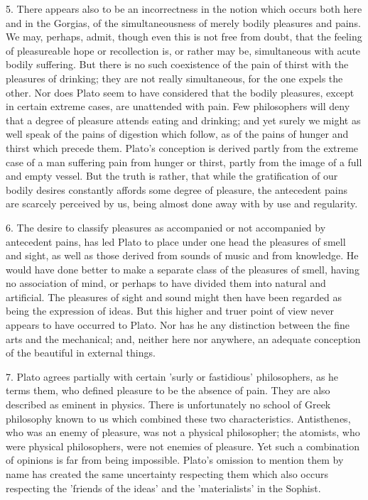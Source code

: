 \documentclass[11pt,letter]{article}
\begin{document}
\par  5. There appears also to be an incorrectness in the notion which occurs both here and in the Gorgias, of the simultaneousness of merely bodily pleasures and pains. We may, perhaps, admit, though even this is not free from doubt, that the feeling of pleasureable hope or recollection is, or rather may be, simultaneous with acute bodily suffering. But there is no such coexistence of the pain of thirst with the pleasures of drinking; they are not really simultaneous, for the one expels the other. Nor does Plato seem to have considered that the bodily pleasures, except in certain extreme cases, are unattended with pain. Few philosophers will deny that a degree of pleasure attends eating and drinking; and yet surely we might as well speak of the pains of digestion which follow, as of the pains of hunger and thirst which precede them. Plato's conception is derived partly from the extreme case of a man suffering pain from hunger or thirst, partly from the image of a full and empty vessel. But the truth is rather, that while the gratification of our bodily desires constantly affords some degree of pleasure, the antecedent pains are scarcely perceived by us, being almost done away with by use and regularity.

\par  6. The desire to classify pleasures as accompanied or not accompanied by antecedent pains, has led Plato to place under one head the pleasures of smell and sight, as well as those derived from sounds of music and from knowledge. He would have done better to make a separate class of the pleasures of smell, having no association of mind, or perhaps to have divided them into natural and artificial. The pleasures of sight and sound might then have been regarded as being the expression of ideas. But this higher and truer point of view never appears to have occurred to Plato. Nor has he any distinction between the fine arts and the mechanical; and, neither here nor anywhere, an adequate conception of the beautiful in external things.

\par  7. Plato agrees partially with certain 'surly or fastidious' philosophers, as he terms them, who defined pleasure to be the absence of pain. They are also described as eminent in physics. There is unfortunately no school of Greek philosophy known to us which combined these two characteristics. Antisthenes, who was an enemy of pleasure, was not a physical philosopher; the atomists, who were physical philosophers, were not enemies of pleasure. Yet such a combination of opinions is far from being impossible. Plato's omission to mention them by name has created the same uncertainty respecting them which also occurs respecting the 'friends of the ideas' and the 'materialists' in the Sophist.
\end{document}
